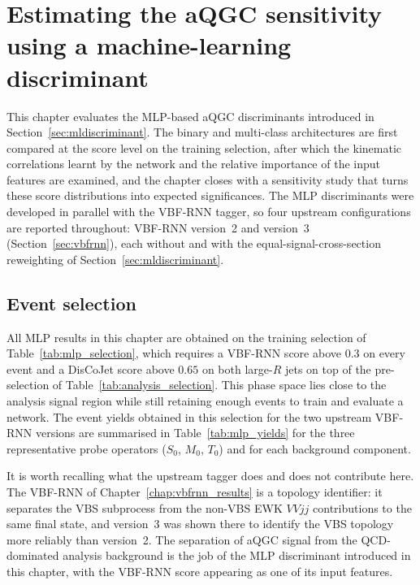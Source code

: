 \chapter{Estimating the aQGC sensitivity using a machine-learning discriminant}
\label{chap:mldiscriminant_results}

This chapter evaluates the MLP-based aQGC discriminants introduced in Section~\ref{sec:mldiscriminant}. The binary and multi-class architectures are first compared at the score level on the training selection, after which the kinematic correlations learnt by the network and the relative importance of the input features are examined, and the chapter closes with a sensitivity study that turns these score distributions into expected significances. The MLP discriminants were developed in parallel with the VBF-RNN tagger, so four upstream configurations are reported throughout: VBF-RNN version~2 and version~3 (Section~\ref{sec:vbfrnn}), each without and with the equal-signal-cross-section reweighting of Section~\ref{sec:mldiscriminant}. 

\section{Event selection}
\label{sec:event_selection}

All MLP results in this chapter are obtained on the training selection of Table~\ref{tab:mlp_selection}, which requires a VBF-RNN score above $0.3$ on every event and a DisCoJet score above $0.65$ on both large-$R$ jets on top of the pre-selection of Table~\ref{tab:analysis_selection}. This phase space lies close to the analysis signal region while still retaining enough events to train and evaluate a network. The event yields obtained in this selection for the two upstream VBF-RNN versions are summarised in Table~\ref{tab:mlp_yields} for the three representative probe operators ($S_0$, $M_0$, $T_0$) and for each background component.

It is worth recalling what the upstream tagger does and does not contribute here. The VBF-RNN of Chapter~\ref{chap:vbfrnn_results} is a topology identifier: it separates the VBS subprocess from the non-VBS EWK $VVjj$ contributions to the same final state, and version~3 was shown there to identify the VBS topology more reliably than version~2. The separation of aQGC signal from the QCD-dominated analysis background is the job of the MLP discriminant introduced in this chapter, with the VBF-RNN score appearing as one of its input features.

